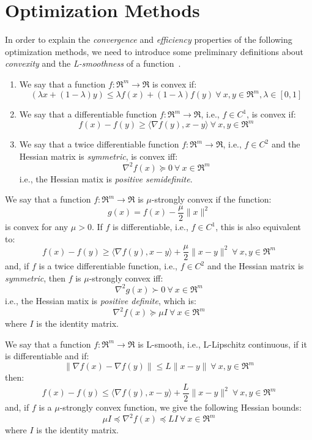 \section{Optimization Methods}

In order to explain the \emph{convergence} and \emph{efficiency} properties of the following optimization methods, we need to introduce some preliminary definitions about \emph{convexity} and the \emph{L-smoothness} of a function~\cite{boyd2004convex}.

\begin{definition}[Convexity] \label{def:convexity}
	\hfill
	\begin{enumerate}[i]
		\item We say that a function $f: \Re^m \rightarrow \Re$ is convex if: 
		$$ 
			(\lambda x + (1 - \lambda) y ) \leq \lambda f(x) + (1 - \lambda) f(y) \ \forall \ x, y \in \Re^m, \lambda \in [0,1] 
		$$
		\item We say that a differentiable function $f: \Re^m \rightarrow \Re$, i.e., $f \in C^1$, is convex if: 
		$$ 
			f(x) - f(y) \geq \langle \nabla f(y), x - y \rangle \ \forall \ x, y \in \Re^m 
		$$
		\item We say that a twice differentiable function $f: \Re^m \rightarrow \Re$, i.e., $f \in C^2$ and the Hessian matrix is \emph{symmetric}, is convex iff: 
		$$ 
			\nabla^2 f(x) \succeq 0 \ \forall \ x \in \Re^m 
		$$ i.e., the Hessian matix is \emph{positive semidefinite}.
	\end{enumerate}
\end{definition}

\begin{definition} \label{def:strong_convexity}
We say that a function $f: \Re^m \rightarrow \Re$ is $\mu$-strongly convex if the function:
$$
g(x) = f(x) - \frac{\mu}{2} \| x \|^2
$$
is convex for any $\mu > 0$. 
If $f$ is differentiable, i.e., $f \in C^1$, this is also equivalent to:
$$
f(x) - f(y) \geq \langle \nabla f(y), x - y \rangle + \frac{\mu}{2} \| x - y \|^2 \ \forall \ x, y \in \Re^m
$$
and, if $f$ is a twice differentiable function, i.e., $f \in C^2$ and the Hessian matrix is \emph{symmetric}, then $f$ is $\mu$-strongly convex iff:
$$
\nabla^2 g(x) \succ 0 \ \forall \ x \in \Re^m
$$
i.e., the Hessian matix is \emph{positive definite}, which is:
$$
\nabla^2 f(x) \succeq \mu I \ \forall \ x \in \Re^m
$$
where $I$ is the identity matrix.
\end{definition}

\begin{definition}[L-smoothness] \label{def:l_smoothness}
We say that a function $f: \Re^m \rightarrow \Re$ is L-smooth, i.e., L-Lipschitz continuous, if it is differentiable and if:
$$
\| \nabla f(x) - \nabla f(y) \| \leq L \| x - y \| \ \forall \ x, y \in \Re^m
$$
then:
$$
f(x) - f(y) \leq \langle \nabla f(y), x - y \rangle + \frac{L}{2} \| x - y \|^2 \ \forall \ x, y \in \Re^m
$$
and, if $f$ is a $\mu$-strongly convex function, we give the following Hessian bounds:
$$
\mu I \preceq \nabla^2 f(x) \preceq L I \ \forall \ x \in \Re^m
$$
where $I$ is the identity matrix.
\end{definition}

